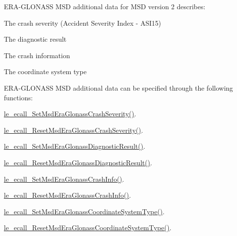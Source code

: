 E\+R\+A-\/\+G\+L\+O\+N\+A\+SS M\+SD additional data for M\+SD version 2 describes\+:
\begin{DoxyItemize}
\item The crash severity (Accident Severity Index -\/ A\+S\+I15)
\item The diagnostic result
\item The crash information
\item The coordinate system type
\end{DoxyItemize}

E\+R\+A-\/\+G\+L\+O\+N\+A\+SS M\+SD additional data can be specified through the following functions\+:
\begin{DoxyItemize}
\item \hyperlink{le__ecall__interface_8h_a577f3dcd16e53c8a14295ec58c6d2b9a}{le\+\_\+ecall\+\_\+\+Set\+Msd\+Era\+Glonass\+Crash\+Severity()}.
\item \hyperlink{le__ecall__interface_8h_addb2874aacaffba2731354c4ac9428bf}{le\+\_\+ecall\+\_\+\+Reset\+Msd\+Era\+Glonass\+Crash\+Severity()}.
\item \hyperlink{le__ecall__interface_8h_a51ad61edf379cfe07f03fbd71b56df9d}{le\+\_\+ecall\+\_\+\+Set\+Msd\+Era\+Glonass\+Diagnostic\+Result()}.
\item \hyperlink{le__ecall__interface_8h_ad3e06b90843a480d68dc99ead29ae8d0}{le\+\_\+ecall\+\_\+\+Reset\+Msd\+Era\+Glonass\+Diagnostic\+Result()}.
\item \hyperlink{le__ecall__interface_8h_a08c613df57d34eb2a1309738bced5d76}{le\+\_\+ecall\+\_\+\+Set\+Msd\+Era\+Glonass\+Crash\+Info()}.
\item \hyperlink{le__ecall__interface_8h_ab883aa41416ada9746acfbb75a0039a8}{le\+\_\+ecall\+\_\+\+Reset\+Msd\+Era\+Glonass\+Crash\+Info()}.
\item \hyperlink{le__ecall__interface_8h_aba15bc78d2e03b5bf8c16ee366fb39b9}{le\+\_\+ecall\+\_\+\+Set\+Msd\+Era\+Glonass\+Coordinate\+System\+Type()}.
\item \hyperlink{le__ecall__interface_8h_a7ca8cd2cfbf76310d1e65d34dfc3b220}{le\+\_\+ecall\+\_\+\+Reset\+Msd\+Era\+Glonass\+Coordinate\+System\+Type()}.
\end{DoxyItemize}


